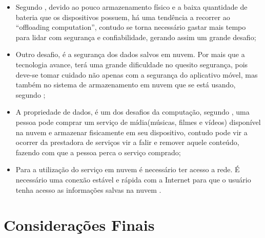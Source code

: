 \documentclass[12pt]{article}
\begin{document}
\begin{itemize}
 \item Segundo \cite{kumar2014}, devido ao pouco armazenamento físico e a baixa quantidade de bateria que os dispositivos
 possuem, há uma tendência a recorrer ao “offloading computation”, contudo se torna necessário gastar mais tempo para lidar com
 segurança e confiabilidade, gerando assim um grande desafio;
 
 \item Outro desafio, é a segurança dos dados salvos em nuvem. Por mais que a tecnologia avance, terá uma grande dificuldade no
 quesito segurança, pois deve-se tomar cuidado não apenas com a segurança do aplicativo móvel, mas também no sistema de
 armazenamento em nuvem que se está usando, segundo \cite{kumar2014};
 
 \item A propriedade de dados, é um dos desafios da computação, segundo \cite{alizadeh2013}, uma pessoa pode comprar um serviço 
 de mídia(músicas, filmes e vídeos) disponível na nuvem e armazenar fisicamente em seu dispositivo, contudo pode vir a ocorrer da
 prestadora de serviços vir a falir e remover aquele conteúdo, fazendo com que a pessoa perca o serviço comprado;
 
 \item Para a utilização do serviço em nuvem é necessário ter acesso a rede. É necessário uma conexão estável e rápida com a
 Internet para que o usuário tenha acesso as informações salvas na nuvem \cite{alizadeh2013}.
 
\end{itemize}


\section{Considerações Finais}



\end{document}

